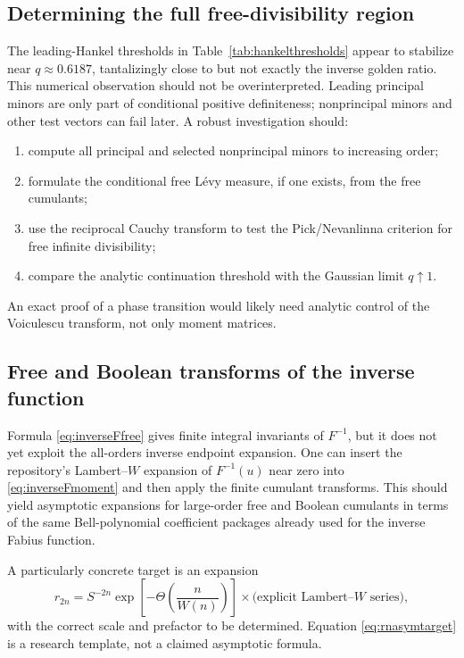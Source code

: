 \documentclass[11pt,oneside]{article}
\theoremstyle{definition}
\theoremstyle{remark}
\begin{document}
\subsection{Determining the full free-divisibility region}
The leading-Hankel thresholds in Table~\ref{tab:hankelthresholds} appear to stabilize near \(q\approx0.6187\), tantalizingly close to but not exactly the inverse golden ratio. This numerical observation should not be overinterpreted. Leading principal minors are only part of conditional positive definiteness; nonprincipal minors and other test vectors can fail later. A robust investigation should:
\begin{enumerate}[label=(\alph*)]
\item compute all principal and selected nonprincipal minors to increasing order;
\item formulate the conditional free L\'evy measure, if one exists, from the free cumulants;
\item use the reciprocal Cauchy transform to test the Pick/Nevanlinna criterion for free infinite divisibility;
\item compare the analytic continuation threshold with the Gaussian limit \(q\uparrow1\).
\end{enumerate}
An exact proof of a phase transition would likely need analytic control of the Voiculescu transform, not only moment matrices.

\subsection{Free and Boolean transforms of the inverse function}
Formula \eqref{eq:inverseFfree} gives finite integral invariants of \(F^{-1}\), but it does not yet exploit the all-orders inverse endpoint expansion. One can insert the repository's Lambert--\(W\) expansion of \(F^{-1}(u)\) near zero into \eqref{eq:inverseFmoment} and then apply the finite cumulant transforms. This should yield asymptotic expansions for large-order free and Boolean cumulants in terms of the same Bell-polynomial coefficient packages already used for the inverse Fabius function.

A particularly concrete target is an expansion
\begin{equation}\label{eq:rnasymtarget}
r_{2n}=S^{-2n}\exp\!\left[-\Theta\!\left(\frac{n}{W(n)}\right)\right]
\times\bigl(\text{explicit Lambert--\(W\) series}\bigr),
\end{equation}
with the correct scale and prefactor to be determined. Equation \eqref{eq:rnasymtarget} is a research template, not a claimed asymptotic formula.
\end{document}
